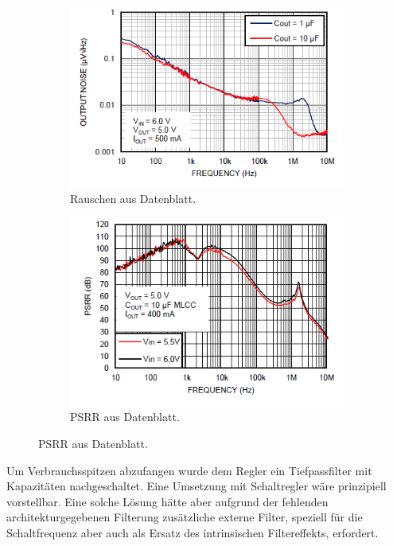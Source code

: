 \begin{figure}[H]
	\begin{subfigure}[b]{0.5\textwidth}
		\includegraphics[clip,scale=0.6]{data/images/ldo_noise}
		\caption{Rauschen aus Datenblatt\cite{LP38798}.}
		\label{fig:ldo_rauschen}
	\end{subfigure}
	\hfill
	\begin{subfigure}[b]{0.5\textwidth}
		\includegraphics[clip,scale=0.6]{data/images/ldo_psrr}
		\caption{PSRR aus Datenblatt\cite{LP38798}.}
		\label{fig:ldo_psrr}
	\end{subfigure}
\end{figure}

Um Verbrauchsspitzen abzufangen wurde dem Regler ein Tiefpassfilter mit Kapazitäten nachgeschaltet.
Eine Umsetzung mit Schaltregler wäre prinzipiell vorstellbar. Eine solche Lösung hätte aber aufgrund der fehlenden architekturgegebenen Filterung zusätzliche externe Filter, speziell für die Schaltfrequenz aber auch als Ersatz des intrinsischen Filtereffekts, erfordert.

